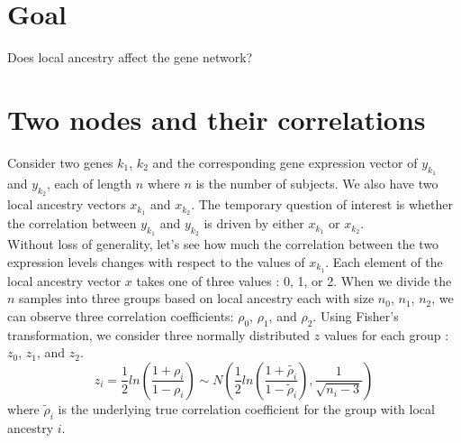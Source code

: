 \documentclass[11pt]{article}
\begin{document}
\section*{Goal}
Does local ancestry affect the gene network?

\section*{Two nodes and their correlations}
Consider two genes $k_1$, $k_2$ and the corresponding gene expression vector of $y_{k_1}$ and $y_{k_2}$, each of length $n$ where $n$ is the number of subjects. We also have two local ancestry vectors $x_{k_1}$ and $x_{k_2}$. The temporary question of interest is whether the correlation between $y_{k_1}$ and $y_{k_2}$ is driven by either $x_{k_1}$ or $x_{k_2}$.\\

\noindent
Without loss of generality, let's see how much the correlation between the two expression levels changes with respect to the values of $x_{k_1}$. Each element of the local ancestry vector $x$ takes one of three values : 0, 1, or 2. When we divide the $n$ samples into three groups based on local ancestry each with size $n_0$, $n_1$, $n_2$, we can observe three correlation coefficients: $\rho_0$, $\rho_1$, and $\rho_2$. Using Fisher's transformation, we consider three normally distributed $z$ values for each group : $z_0$, $z_1$, and $z_2$. 
$$z_i = \frac{1}{2} ln \left( \frac{1+\rho_i}{1-\rho_i}\right) \sim N\left(\frac{1}{2} ln\left(\frac{1+\tilde{\rho_i}}{1-\tilde{\rho}_i}\right), \frac{1}{\sqrt{n_i-3}}\right)$$
\noindent where $\tilde{\rho}_i$ is the underlying true correlation coefficient for the group with local ancestry $i$. \\
\end{document}
